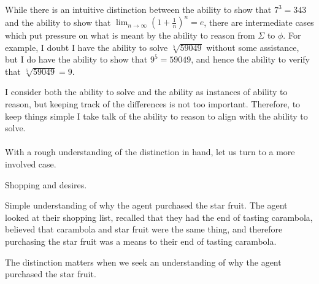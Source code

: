 \documentclass[10pt]{article}
\begin{document}
While there is an intuitive distinction between the ability to show that \(7^{3} = 343\) and the ability to show that \(\lim_{n \to \infty}\left(1 + \frac{1}{n} \right)^{n} = e\), there are intermediate cases which put pressure on what is meant by the ability to reason from \(\Sigma\) to \(\phi\).
For example, I doubt I have the ability to solve \(\sqrt[5]{59049}\) without some assistance, but I do have the ability to show that \(9^{5} = 59049\), and hence the ability to verify that \(\sqrt[5]{59049} = 9\).

I consider both the ability to solve and the ability as instances of ability to reason, but keeping track of the differences is not too important.
Therefore, to keep things simple I take talk of the ability to reason to align with the ability to solve.



\paragraph{ }
With a rough understanding of the distinction in hand, let us turn to a more involved case.

Shopping and desires.


Simple understanding of why the agent purchased the star fruit.
The agent looked at their shopping list, recalled that they had the end of tasting carambola, believed that carambola and star fruit were the same thing, and therefore purchasing the star fruit was a means to their end of tasting carambola.



The distinction matters when we seek an understanding of why the agent purchased the star fruit.








\newpage
\end{document}
